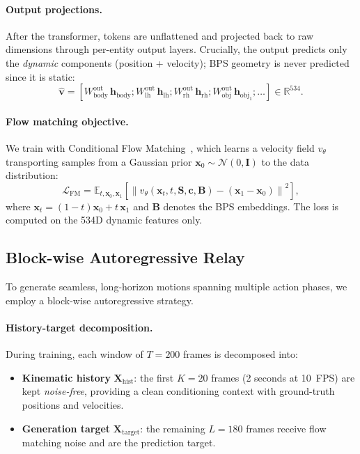 \paragraph{Output projections.}
After the transformer, tokens are unflattened and projected back to raw dimensions through per-entity output layers. Crucially, the output predicts only the \emph{dynamic} components (position + velocity); BPS geometry is never predicted since it is static:
\begin{equation}
    \hat{\mathbf{v}} = [W_{\text{body}}^{\text{out}}\,\mathbf{h}_{\text{body}}; W_{\text{lh}}^{\text{out}}\,\mathbf{h}_{\text{lh}}; W_{\text{rh}}^{\text{out}}\,\mathbf{h}_{\text{rh}}; W_{\text{obj}}^{\text{out}}\,\mathbf{h}_{\text{obj}_1}; \ldots] \in \mathbb{R}^{534}.
    \label{eq:output}
\end{equation}

\paragraph{Flow matching objective.}
We train with Conditional Flow Matching~\cite{lipman2023flow}, which learns a velocity field $v_\theta$ transporting samples from a Gaussian prior $\mathbf{x}_0 \sim \mathcal{N}(0, \mathbf{I})$ to the data distribution:
\begin{equation}
    \mathcal{L}_{\text{FM}} = \mathbb{E}_{t, \mathbf{x}_0, \mathbf{x}_1}\left[\left\| v_\theta(\mathbf{x}_t, t, \mathbf{S}, \mathbf{c}, \mathbf{B}) - (\mathbf{x}_1 - \mathbf{x}_0) \right\|^2\right],
    \label{eq:fm_loss}
\end{equation}
where $\mathbf{x}_t = (1{-}t)\mathbf{x}_0 + t\,\mathbf{x}_1$ and $\mathbf{B}$ denotes the BPS embeddings. The loss is computed on the 534D dynamic features only.


\subsection{Block-wise Autoregressive Relay}
\label{sec:autoreg}

To generate seamless, long-horizon motions spanning multiple action phases, we employ a block-wise autoregressive strategy.

\paragraph{History-target decomposition.}
During training, each window of $T{=}200$ frames is decomposed into:
\begin{itemize}
    \item \textbf{Kinematic history} $\mathbf{X}_{\text{hist}}$: the first $K{=}20$ frames (2 seconds at 10~FPS) are kept \emph{noise-free}, providing a clean conditioning context with ground-truth positions and velocities.
    \item \textbf{Generation target} $\mathbf{X}_{\text{target}}$: the remaining $L{=}180$ frames receive flow matching noise and are the prediction target.
\end{itemize}

